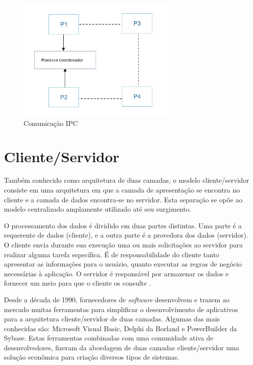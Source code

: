 \begin{figure}
    \centering
    \includegraphics[width=0.7\textwidth]{figuras/ipc.png}
    \caption{Comunicação IPC}
    \label{fig:how-communication-works}
\end{figure}

\section{Cliente/Servidor}\label{sec:clientserver}

Também conhecido como arquitetura de duas camadas, o modelo cliente/servidor consiste em uma arquitetura em que a camada de apresentação se encontra no cliente e a camada de dados encontra-se no servidor. Esta separação se opõe ao modelo centralizado amplamente utilizado até seu surgimento.

O processamento dos dados é dividido em duas partes distintas. Uma parte é a requerente de dados (cliente), e a outra parte é a provedora dos dados (servidor). O cliente envia durante sua execução uma ou mais solicitações ao servidor para realizar alguma tarefa específica. É de responsabilidade do cliente tanto apresentar as informações para o usuário, quanto executar as regras de negócio necessárias à aplicação. O servidor é responsável por armazenar os dados e fornecer um meio para que o cliente os consulte \cite{two-tier}.

Desde a década de 1990, fornecedores de \textit{software} desenvolvem e trazem ao mercado muitas ferramentas para simplificar o desenvolvimento de aplicativos para a arquitetura cliente/servidor de duas camadas. Algumas das mais conhecidas são: Microsoft Visual Basic, Delphi da Borland e PowerBuilder da Sybase. Estas ferramentas combinadas com uma comunidade ativa de desenvolvedores, fizeram da abordagem de duas camadas cliente/servidor uma solução econômica para criação diversos tipos de sistemas.


